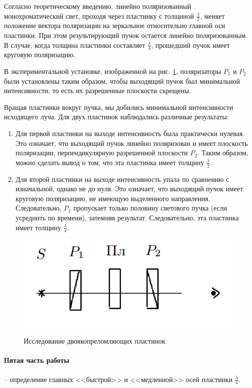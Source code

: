 Согласно теоретическому введению, линейно поляризованный монохроматический свет, проходя через пластинку с толщиной $\frac \lambda 2$, меняет положение вектора поляризации на зеркальное относительно главной оси пластинки. При этом результирующий пучок остается линейно поляризованным. В случае, когда толщина пластинки составляет $\frac \lambda 4$, прошедший пучок имеет круговую поляризацию. 

В экспериментальной установке, изображенной на рис. \ref{lambda}, поляризаторы $P_1$ и $P_2$ были установлены таким образом, чтобы выходящий пучок был минимальной интенсивности, то есть их разрешенные плоскости скрещены. 

Вращая пластинки вокруг пучка, мы добились минимальной интенсивности исходящего луча. Для двух пластинок наблюдались различные результаты:
\begin{enumerate}
    \item Для первой пластинки на выходе интенсивность была практически нулевая. Это означает, что выходящий пучок линейно поляризован и имеет плоскость поляризации, перпендикулярную разрешенной плоскости $P_2$. Таким образом, можно сделать вывод о том, что эта пластинка имеет толщину $\frac \lambda 2$.
    \item Для второй пластинки на выходе интенсивность упала по сравнению с изначальной, однако не до нуля. Это означает, что выходящий пучок имеет круговую поляризацию, не имеющую выделенного направления. Следовательно, $P_2$ пропускает только половину светового пучка (если усреднить по времени), затемняя результат. Следовательно, эта пластинка имеет толщину $\frac \lambda 4$.
\end{enumerate}

\begin{figure}[!hb]
	\centering
	\includegraphics[width=0.5\linewidth]{pics/lambda.png}
	\caption{{Исследование двоякопреломляющих пластинок}}
	\label{lambda}
\end{figure}


\paragraph{Пятая часть работы} -- определение главных <<быстрой>> и <<медленной>> осей пластинки $\frac \lambda 4$.

